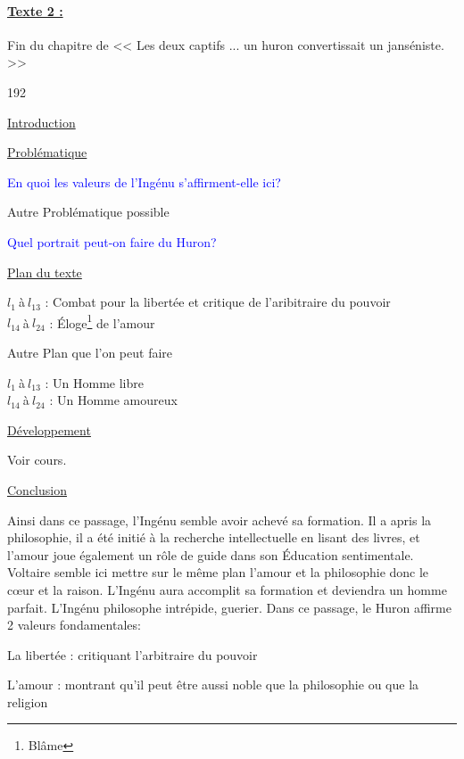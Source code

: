 \documentclass[12pt,a4paper]{article}
\begin{document}
							\paragraph[Texte 2 (6)]{\textbf{\underline{Texte 2 : }}}
		Fin du chapitre \textsc{} de << Les deux captifs ... un huron convertissait un janséniste. >>
\begin{dingautolist}{192}

\item \underline{Introduction} \par

\item \underline{Probl\'ematique }\par
	\textcolor{blue}{En quoi les valeurs de l'Ingénu s'affirment-elle ici?}\par
	Autre Problématique possible \par
	\textcolor{blue}{Quel portrait peut-on faire du Huron?}


\item \underline{Plan du texte} \par
	$l_{1}~$\`a$~l_{13}$ : Combat pour la libertée et critique de l'aribitraire du pouvoir\\
    $l_{14}~$\`a$~l_{24}$ : \'Eloge\footnote{Blâme} de l'amour \par
Autre Plan que l'on peut faire\par
	$l_{1}~$\`a$~l_{13}$ : Un Homme libre\\
    $l_{14}~$\`a$~l_{24}$ : Un Homme amoureux


\item \underline{D\'eveloppement} \par
        Voir cours.

\item \underline{Conclusion} \par
	Ainsi dans ce passage, l'Ingénu semble avoir achevé sa formation.
	Il a apris la philosophie, il a été initié à la recherche intellectuelle en lisant des livres, et l'amour joue également un rôle de guide dans son \'Education sentimentale. 
	Voltaire semble ici mettre sur le même plan l'amour et la philosophie donc le c\oe ur et la raison.
	L'Ingénu aura accomplit sa formation et deviendra un homme parfait.
	L'Ingénu philosophe intrépide, guerier.
	Dans ce passage, le Huron affirme 2 valeurs fondamentales:\par
	La libertée : critiquant l'arbitraire du pouvoir\par
	L'amour : montrant qu'il peut être aussi noble que la philosophie ou que la religion \par

\end{dingautolist}
 \newpage
\end{document}
